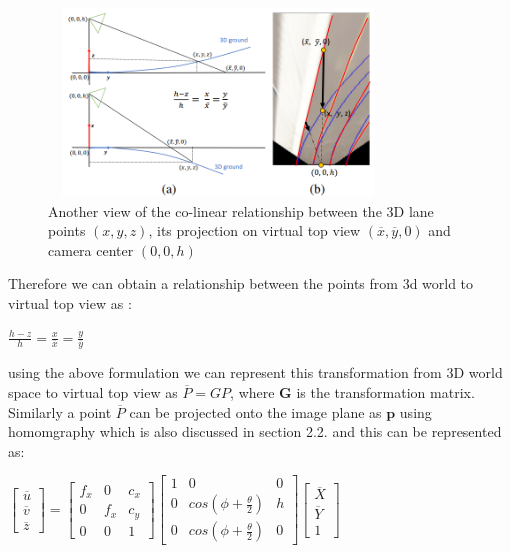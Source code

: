       \begin{figure}[h]
    \centering
    \includegraphics[width=9cm, height=5cm]{images/collinear_3dlane.png}
    \caption{Another view of the co-linear relationship between the 3D lane points $(x,y,z)$, its projection on virtual top view $(\overline{x}, \overline{y},0)$ and camera center $(0,0,h)$ \cite{guo2020gen}}
    \end{figure}

    Therefore we can obtain a relationship between the points from 3d world to virtual top view as :
    \begin{center}
        $\frac{h-z}{h} =\frac{x}{\overline{x}}=\frac{y}{\overline{y}}$ 
    \end{center}
    
    using the above formulation we can represent this transformation from 3D world space to virtual top view as \textbf{$\overline{P} = GP$}, where \textbf{G} is the transformation matrix. Similarly a point \textbf{$\overline{P}$} can be projected onto the image plane as $\textbf{p}$ using homomgraphy which is also discussed in section 2.2. and this can be represented as: 
    \begin{center}
       $\begin{bmatrix}\overline{u}  \\\overline{v} \\ \overline{z}\end{bmatrix} = \begin{bmatrix} f_{x} & 0& c_{x}  \\0 &f_{x} & c_{y} \\ 0 & 0 & 1     \end{bmatrix}\begin{bmatrix} 1 & 0& 0  \\0 &cos(\phi+ \frac{\theta}{2}) & h \\ 0 &cos(\phi+ \frac{\theta}{2}) & 0     \end{bmatrix}\begin{bmatrix}\overline{X}  \\\overline{Y} \\ 1\end{bmatrix}$
    \end{center}

